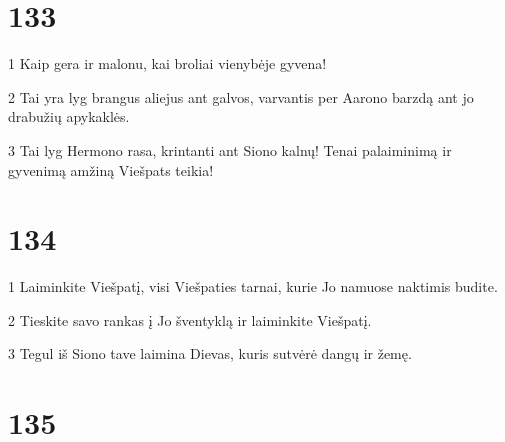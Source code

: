 \chapter{133}


\par 1 Kaip gera ir malonu, kai broliai vienybėje gyvena! 
\par 2 Tai yra lyg brangus aliejus ant galvos, varvantis per Aarono barzdą ant jo drabužių apykaklės. 
\par 3 Tai lyg Hermono rasa, krintanti ant Siono kalnų! Tenai palaiminimą ir gyvenimą amžiną Viešpats teikia!


\chapter{134}


\par 1 Laiminkite Viešpatį, visi Viešpaties tarnai, kurie Jo namuose naktimis budite. 
\par 2 Tieskite savo rankas į Jo šventyklą ir laiminkite Viešpatį. 
\par 3 Tegul iš Siono tave laimina Dievas, kuris sutvėrė dangų ir žemę.


\chapter{135}


